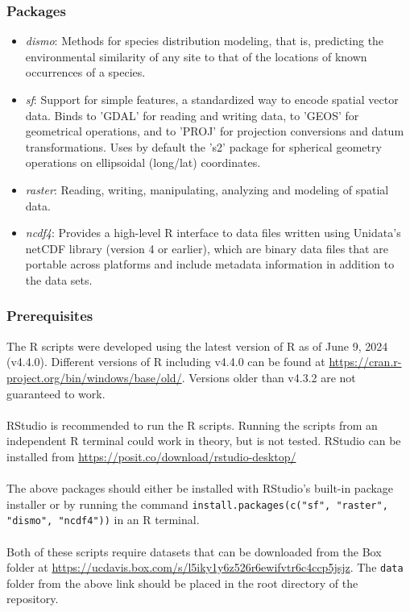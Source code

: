 \documentclass{article}
\begin{document}
\subsubsection*{Packages}

\begin{itemize}
	\item \textit{dismo}: Methods for species distribution modeling, that is, predicting the environmental similarity of any site to that of the locations of known occurrences of a species.
	\item \textit{sf}: Support for simple features, a standardized way to encode spatial vector data. Binds to 'GDAL' for reading and writing data, to 'GEOS' for geometrical operations, and to 'PROJ' for projection conversions and datum transformations. Uses by default the 's2' package for spherical geometry operations on ellipsoidal (long/lat) coordinates.
	\item \textit{raster}: Reading, writing, manipulating, analyzing and modeling of spatial data. 
	\item \textit{ncdf4}: Provides a high-level R interface to data files written using Unidata's netCDF library (version 4 or earlier), which are binary data files that are portable across platforms and include metadata information in addition to the data sets.
\end{itemize}

\subsubsection*{Prerequisites}

The R scripts were developed using the latest version of R as of June 9, 2024 (v4.4.0). Different versions of R including v4.4.0 can be found at \url{https://cran.r-project.org/bin/windows/base/old/}. Versions older than v4.3.2 are not guaranteed to work.
\\\\
RStudio is recommended to run the R scripts. Running the scripts from an independent R terminal could work in theory, but is not tested. RStudio can be installed from \url{https://posit.co/download/rstudio-desktop/}
\\\\
The above packages should either be installed with RStudio's built-in package installer or by running the command \texttt{install.packages(c("sf", "raster", "dismo", "ncdf4"))} in an R terminal.
\\\\
Both of these scripts require datasets that can be downloaded from the Box folder at \url{https://ucdavis.box.com/s/l5iky1y6z526r6ewifvtr6c4ccp5jsjz}. The \texttt{data} folder from the above link should be placed in the root directory of the repository. 
\end{document}
